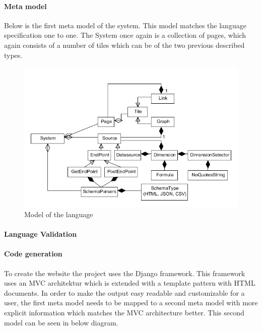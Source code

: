 \paragraph{Meta model}
Below is the first meta model of the system. 
This model matches the language specification one to one. 
The System once again is a collection of pages, which again consists of a number of tiles which can be of the two previous described types. 

\begin{figure}
\begin{center}
\includegraphics[width=\linewidth]{images/languagemodel}
\end{center}
\caption{Model of the language}
\label{fig:languagemodel}
\end{figure}

\paragraph{Language Validation}

\paragraph{Code generation}
To create the website the project uses the Django framework. 
This framework uses an MVC architektur which is extended with a template pattern with HTML documents. 
In order to make the output easy readable and customizable for a user, the first meta model needs to be mapped to a second meta model with more explicit information which matches the MVC architecture better.
This second model can be seen in below diagram. 

